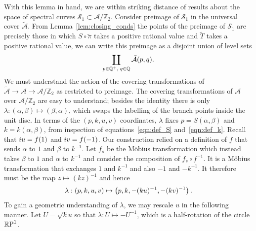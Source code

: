 \documentclass{article}
\begin{document}
With this lemma in hand, we are within striking distance of results about the space of spectral curves $\mathcal{S}_1 \subset \mathcal{A}/\mathbb{Z}_2$. Consider preimage of $\mathcal{S}_1$ in the universal cover $\mathcal{\tilde{A}}$. From Lemma~\ref{lem:closing_conds} the points of the preimage of $\mathcal{S}_1$ are precisely those in which $S\circ\tilde{\pi}$ takes a positive rational value and $\tilde{T}$ takes a positive rational value, we can write this preimage as a disjoint union of level sets
\[
\coprod_{p\in \mathbb{Q}^+,\; q\in \mathbb{Q}} \mathcal{\tilde{A}}(p,q).
\]
We must understand the action of the covering transformations of $\mathcal{\tilde{A}} \to \mathcal{A} \to \mathcal{A}/\mathbb{Z}_2$ as restricted to preimage. The covering transformations of $\mathcal{A}$ over $\mathcal{A}/\mathbb{Z}_2$ are easy to understand; besides the identity there is only $\lambda : (\alpha,\beta) \mapsto (\beta,\alpha)$, which swaps the labelling of the branch points inside the unit disc. 
In terms of the $(p,k,u,v)$ coordinates, $\lambda$ fixes $p = S(\alpha,\beta)$ and $k = k(\alpha,\beta)$, from inspection of equations~\eqref{eqn:def_S} and~\eqref{eqn:def_k}. Recall that $i u = f(1)$ and $i v = f(-1)$. Our construction relied on a definition of $f$ that sends $\alpha$ to $1$ and $\beta$ to $k^{-1}$. Let $f_s$ be the M\"obius transformation which instead takes $\beta$ to $1$ and $\alpha$ to $k^{-1}$ and consider the composition of $f_s \circ f^{-1}$. It is a M\"obius transformation that exchanges $1$ and $k^{-1}$ and also $-1$ and $-k^{-1}$. It therefore must be the map $z \mapsto (kz)^{-1}$ and hence
\[
\lambda: (p,k,u,v) \mapsto \left( p,k, -(ku)^{-1}, -(kv)^{-1} \right).
\]
To gain a geometric understanding of $\lambda$, we may rescale $u$ in the following manner. Let $U=\sqrt{k} u$ so that $\lambda: U \mapsto -U^{-1}$,
which is a half-rotation of the circle $\mathbb{R}\text{P}^1$.

\end{document}
